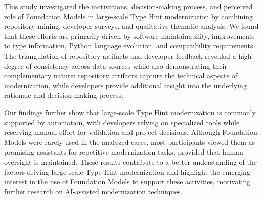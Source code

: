 This study investigated the motivations, decision-making process, and perceived role of Foundation Models in large-scale Type Hint modernization by combining repository mining, developer surveys, and qualitative thematic analysis. We found that these efforts are primarily driven by software maintainability, improvements to type information, Python language evolution, and compatibility requirements. The triangulation of repository artifacts and developer feedback revealed a high degree of consistency across data sources while also demonstrating their complementary nature: repository artifacts capture the technical aspects of modernization, while developers provide additional insight into the underlying rationale and decision-making process.

Our findings further show that large-scale Type Hint modernization is commonly supported by automation, with developers relying on specialized tools while reserving manual effort for validation and project decisions. Although Foundation Models were rarely used in the analyzed cases, most participants viewed them as promising assistants for repetitive modernization tasks, provided that human oversight is maintained. These results contribute to a better understanding of the factors driving large-scale Type Hint modernization and highlight the emerging interest in the use of Foundation Models to support these activities, motivating further research on AI-assisted modernization techniques.